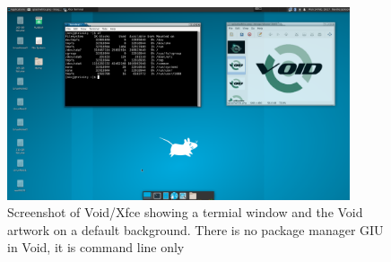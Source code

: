 %

\begin{figure}[!h]
  \centering
   \includegraphics[width=0.9\textwidth]{voidxfcescreen.png}
  \caption{Screenshot of Void/Xfce  showing a termial window and the Void artwork on a default background. There is no package manager GIU in Void, it is command line only}
  \label{fig:voidxfce}
\end{figure}

%

